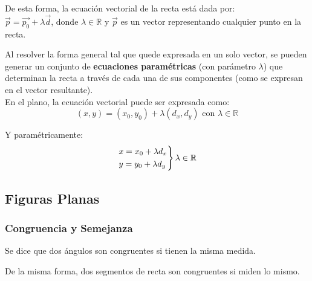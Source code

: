 De esta forma, la ecuación vectorial de la recta está dada por: \\
$\vec{p} = \vec{p_0} + \lambda\vec{d}$, donde $\lambda \in \mathbb{R}$ y $\vec{p}$ es un vector representando cualquier punto en la recta.



Al resolver la forma general tal que quede expresada en un solo vector, se pueden generar un conjunto de \textbf{ecuaciones paramétricas} (con parámetro $\lambda$) que determinan la recta a través de cada una de sus componentes (como se expresan en el vector resultante).\\

En el plano, la ecuación vectorial puede ser expresada como:\\

\begin{equation*}
(x, y) = (x_0, y_0) + \lambda(d_x,d_y) \text{ con } \lambda \in \mathbb{R}
\end{equation*}

Y paramétricamente:
\begin{equation*}
    \begin{rcases}
      x = x_0 + \lambda d_x \\
      y = y_0 + \lambda d_y
    \end{rcases}
    \lambda \in \mathbb{R}
    \end{equation*}
\vfill\null\columnbreak
\subsection{Figuras Planas}
\subsubsection{Congruencia y Semejanza}
Se dice que dos ángulos son congruentes si tienen la misma medida.

De la misma forma, dos segmentos de recta son congruentes si miden lo mismo. \\

